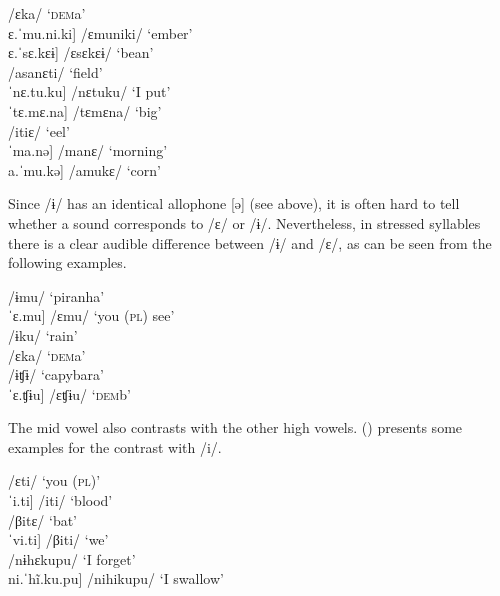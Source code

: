 \ea\label{ex:e}
\ea     \tab[ˈɛ.ka] \tab /ɛka/ \tab\tab ‘\textsc{dem}a’\\
     \tab{[}ɛ.ˈmu.ni.ki] \tab /ɛmuniki/ \tab ‘ember’\\
     \tab{[}ɛ.ˈsɛ.kɛɨ] \tab /ɛsɛkɛɨ/ \tab ‘bean’\\
\ex  \tab[a.ˈsa.nɛ.ti] \tab /asanɛti/ \tab ‘field’\\
     \tab{[}ˈnɛ.tu.ku] \tab /nɛtuku/ \tab ‘I put’\\
    \tab{[}ˈtɛ.mɛ.na] \tab /tɛmɛna/ \tab ‘big’\\
\ex  \tab[i.ˈti.ɛ] \tab /itiɛ/ \tab\tab ‘eel’\\
     \tab{[}ˈma.nǝ] \tab /manɛ/ \tab ‘morning’\\
     \tab{[}a.ˈmu.kǝ] \tab /amukɛ/ \tab ‘corn’\\%
\z
\xe

Since /ɨ/ has an identical allophone [ə] (see above),  it is often hard to tell whether a sound corresponds to /ɛ/ or /ɨ/. Nevertheless, in stressed syllables there is a clear audible difference between /ɨ/ and /ɛ/, as can be seen from the following examples.

  \ea\label{ex:e-ÿ}
\ea     \tab[ˈɨ.mu] \tab /ɨmu/ \tab\tab ‘piranha’\\
    \tab{[}ˈɛ.mu] \tab /ɛmu/ \tab ‘you (\textsc{pl}) see’\\
\ex     \tab[ˈɨ.ku] \tab /ɨku/ \tab\tab ‘rain’\\
      \tab[ˈɛ.ka] \tab /ɛka/ \tab\tab ‘\textsc{dem}a’\\
\ex      \tab[ˈɨ.ʧɨ] \tab\tab /ɨʧɨ/ \tab\tab ‘capybara’\\
     \tab{[}ˈɛ.ʧɨu] \tab /ɛʧɨu/ \tab\tab ‘\textsc{dem}b’\\%
\z
 \xe
 
The mid vowel also contrasts with the other high vowels. () presents some examples for the contrast with /i/.

  \ea\label{ex:e-i}
\ea      \tab[ˈɛ.ti] \tab\tab\tab /ɛti/ \tab\tab ‘you (\textsc{pl})’\\
     \tab{[}ˈi.ti] \tab\tab\tab /iti/ \tab\tab ‘blood’\\
\ex    \tab[ˈvi.tə] \tab\tab /βitɛ/ \tab\tab ‘bat’\\
    \tab{[}ˈvi.ti] \tab\tab /βiti/ \tab\tab ‘we’\\
\ex    \tab[nə.ˈhɛ̃.ku.pu] \tab /nɨhɛkupu/ \tab ‘I forget’\\
     \tab{[}ni.ˈhĩ.ku.pu] \tab /nihikupu/ \tab ‘I swallow’\\%
\z
\xe


